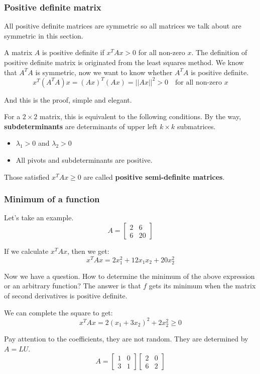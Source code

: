\documentclass[12pt]{ctexart}
\begin{document}
\subsubsection{\textbf{Positive definite matrix}}

All positive definite matrices are symmetric so all matrices we talk about are symmetric
in this section.


A matrix $A$ is positive definite if $x^{T}Ax > 0$ for all non-zero $x$. The
definition of positive definite matrix is originated from the least squares method.
We know that $A^{T}A$ is symmetric, now we want to know whether $A^{T}A$ is positive
definite.
\[
  x^{T}(A^{T}A)x = (Ax)^{T}(Ax) = ||Ax||^{2} > 0 \quad \text{for all non-zero } x
\]

And this is the proof, simple and elegant.

For a $2 \times 2$ matrix, this is equivalent to the following conditions. By the way,
\textbf{subdeterminants} are determinants of upper left $k \times k$ submatrices.
\begin{itemize}
  \item $\lambda_1 > 0$ and $\lambda_2 > 0$
  \item All pivots and subdeterminants are positive.
\end{itemize}

Those satisfied $x^{T}Ax \geq 0$ are called \textbf{positive semi-definite matrices}.

\subsubsection{\textbf{Minimum of a function}}

Let's take an example.
\[
  A = \begin{bmatrix}
    2 & 6 \\
    6 & 20
  \end{bmatrix}
\]

If we calculate $x^{T}Ax$, then we get:
\[
  x^{T}Ax = 2x_1^2 + 12x_1x_2 + 20x_2^2
\]

Now we have a question. How to determine the minimum of the above expression or an
arbitrary function? The answer is that $f$ gets its minimum when the matrix of second
derivatives is positive definite.

We can complete the square to get:
\[
  x^{T}Ax = 2(x_1 + 3x_2)^2 + 2x_2^2 \geq 0
\]

Pay attention to the coefficients, they are not random. They are determined by $A = LU$.
\[
  A = \begin{bmatrix}
    1 & 0 \\
    3 & 1
  \end{bmatrix}
  \begin{bmatrix}
    2 & 0 \\
    6 & 2
  \end{bmatrix}
\]
\end{document}
